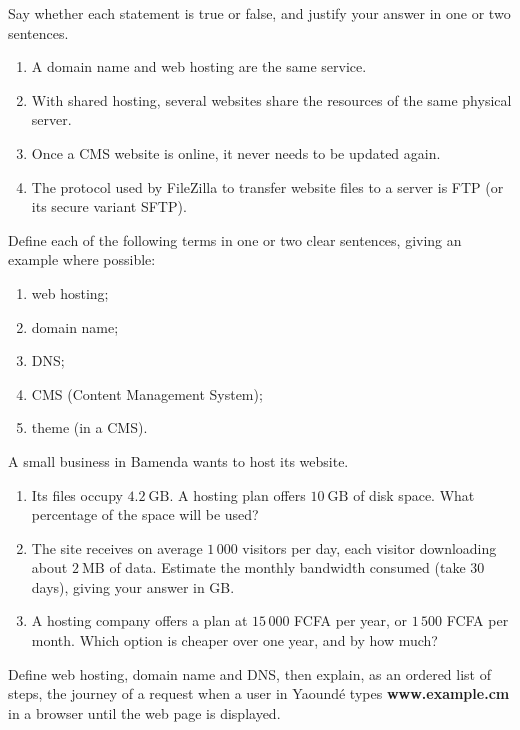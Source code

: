 \documentclass[11pt]{article}
\newcommand{\cle}[1]{{\popxbold\color{popdark}#1}}
\newcounter{popsec}
\newcounter{popsub}
\newcommand{\courssub}[1]{%
  \stepcounter{popsub}%
  \par\vspace{9pt}\noindent{\popxbold\fontsize{11.5}{13}\selectfont\color{popink}{\color{poporange}\thepopsec.\thepopsub}\hspace{6pt}#1}\par\nopagebreak\vspace{4pt}
}
\begin{document}
\begin{exercice}
Say whether each statement is true or false, and justify your answer in one or two sentences.
\begin{enumerate}
\item A domain name and web hosting are the same service.
\item With shared hosting, several websites share the resources of the same physical server.
\item Once a CMS website is online, it never needs to be updated again.
\item The protocol used by FileZilla to transfer website files to a server is FTP (or its secure variant SFTP).
\end{enumerate}
\end{exercice}

\begin{exercice}[Definitions]
Define each of the following terms in one or two clear sentences, giving an example where possible:
\begin{enumerate}
\item web hosting;
\item domain name;
\item DNS;
\item CMS (Content Management System);
\item theme (in a CMS).
\end{enumerate}
\end{exercice}

\begin{exercice}
A small business in Bamenda wants to host its website.
\begin{enumerate}
\item Its files occupy $4.2\ \mathrm{GB}$. A hosting plan offers $10\ \mathrm{GB}$ of disk space. What percentage of the space will be used?
\item The site receives on average $1\,000$ visitors per day, each visitor downloading about $2\ \mathrm{MB}$ of data. Estimate the monthly bandwidth consumed (take $30$ days), giving your answer in GB.
\item A hosting company offers a plan at $15\,000$ FCFA per year, or $1\,500$ FCFA per month. Which option is cheaper over one year, and by how much?
\end{enumerate}
\end{exercice}

\courssub{I practise}

\begin{exercice}
Define \cle{web hosting}, \cle{domain name} and \cle{DNS}, then explain, as an ordered list of steps, the journey of a request when a user in Yaoundé types \textbf{www.example.cm} in a browser until the web page is displayed.
\end{exercice}
\end{document}
